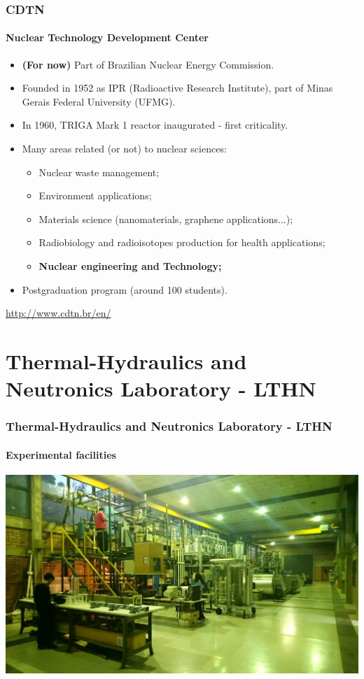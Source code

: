\documentclass[svgnames,smaller,table]{beamer}
\begin{document}
\begin{frame}
  \frametitle{CDTN}
  \framesubtitle{Nuclear Technology Development Center}
  \begin{itemize}
    \item \textbf{(For now)} Part of Brazilian Nuclear Energy Commission.
  \item Founded in 1952 as IPR (Radioactive Research Institute), part of
    Minas Gerais Federal University (UFMG).
  \item In 1960, TRIGA Mark 1 reactor inaugurated - first criticality.
  \item Many areas related (or not) to nuclear sciences:
    \begin{itemize}
    \item Nuclear waste management;
    \item Environment applications;
    \item Materials science (nanomaterials, graphene applications...);
    \item Radiobiology and radioisotopes production for health applications;
    \item \textbf{Nuclear engineering and Technology;}
    \end{itemize}
  \item Postgraduation program (around 100 students).
  \end{itemize}
  \begin{center}
    \url{http://www.cdtn.br/en/}
    \end{center}
\end{frame}


\section{Thermal-Hydraulics and Neutronics Laboratory - LTHN}
\begin{frame}
  \frametitle{Thermal-Hydraulics and Neutronics Laboratory - LTHN}
  \framesubtitle{Experimental facilities}
  \begin{center}
    \includegraphics[scale=0.2]{figuras/labth.jpg}
  \end{center}
\end{frame}
\end{document}
